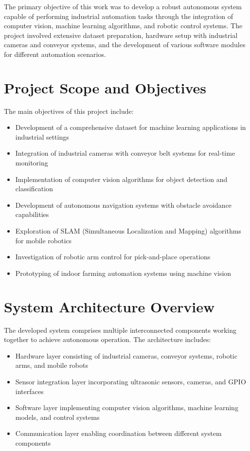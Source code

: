 \documentclass{book}
\begin{document}
\par\noindent The primary objective of this work was to develop a robust autonomous system capable of performing industrial automation tasks through the integration of computer vision, machine learning algorithms, and robotic control systems. The project involved extensive dataset preparation, hardware setup with industrial cameras and conveyor systems, and the development of various software modules for different automation scenarios.

\section{Project Scope and Objectives}

\par\noindent The main objectives of this project include:

\begin{itemize}
\item Development of a comprehensive dataset for machine learning applications in industrial settings
\item Integration of industrial cameras with conveyor belt systems for real-time monitoring
\item Implementation of computer vision algorithms for object detection and classification
\item Development of autonomous navigation systems with obstacle avoidance capabilities
\item Exploration of SLAM (Simultaneous Localization and Mapping) algorithms for mobile robotics
\item Investigation of robotic arm control for pick-and-place operations
\item Prototyping of indoor farming automation systems using machine vision
\end{itemize}

\section{System Architecture Overview}

\par\noindent The developed system comprises multiple interconnected components working together to achieve autonomous operation. The architecture includes:

\begin{itemize}
\item Hardware layer consisting of industrial cameras, conveyor systems, robotic arms, and mobile robots
\item Sensor integration layer incorporating ultrasonic sensors, cameras, and GPIO interfaces
\item Software layer implementing computer vision algorithms, machine learning models, and control systems
\item Communication layer enabling coordination between different system components
\end{itemize}
\end{document}
